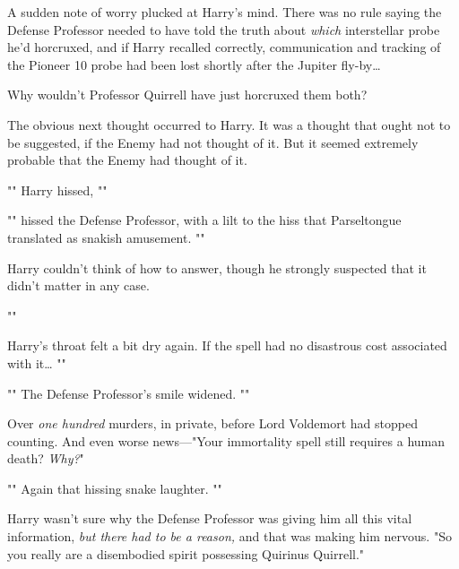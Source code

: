 A sudden note of worry plucked at Harry's mind. There was no rule saying the 
Defense Professor needed to have told the truth about \emph{which} interstellar 
probe he'd horcruxed, and if Harry recalled correctly, communication and 
tracking of the Pioneer 10 probe had been lost shortly after the Jupiter 
fly-by{\ldots}

Why wouldn't Professor Quirrell have just horcruxed them both?

The obvious next thought occurred to Harry. It was a thought that ought not to 
be suggested, if the Enemy had not thought of it. But it seemed extremely 
probable that the Enemy had thought of it.

"" Harry hissed, ""

"" hissed the Defense Professor, with a lilt to the hiss 
that Parseltongue translated as snakish amusement. ""

Harry couldn't think of how to answer, though he strongly suspected that it 
didn't matter in any case.

""

Harry's throat felt a bit dry again. If the spell had no disastrous cost 
associated with it{\ldots} ""

"" 
The Defense Professor's smile widened. ""

Over \emph{one hundred} murders, in private, before Lord Voldemort had stopped 
counting. And even worse news---"Your immortality spell still requires a human 
death? \emph{Why?}"

"" Again that hissing snake laughter. 
""

Harry wasn't sure why the Defense Professor was giving him all this vital 
information, \emph{but there had to be a reason,} and that was making him 
nervous. "So you really are a disembodied spirit possessing Quirinus Quirrell."


